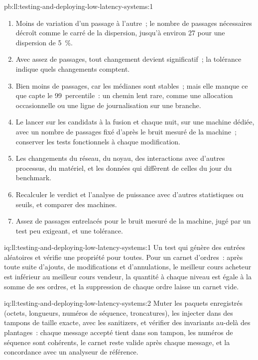 \begin{solution}{pb:ll:testing-and-deploying-low-latency-systems:1}
\begin{enumerate}
\item Moins de variation d'un passage à l'autre~; le nombre de passages nécessaires décroît comme le carré de la dispersion, jusqu'à environ 27 pour une dispersion de 5~\%.
\item Avec assez de passages, tout changement devient significatif~; la tolérance indique quels changements comptent.
\item Bien moins de passages, car les médianes sont stables~; mais elle manque ce que capte le 99~percentile~: un chemin lent rare, comme une
allocation occasionnelle ou une ligne de journalisation sur une branche.
\item Le lancer sur les candidats à la fusion et chaque nuit, sur une machine dédiée, avec un nombre de passages fixé d'après le
bruit mesuré de la machine~; conserver les tests fonctionnels à chaque modification.
\item Les changements du réseau, du noyau, des interactions avec d'autres processus, du matériel, et les données qui diffèrent de
celles du jour du benchmark.
\item Recalculer le verdict et l'analyse de puissance avec d'autres statistiques ou seuils, et comparer des machines.
\item Assez de passages entrelacés pour le bruit mesuré de la machine, jugé par un test peu exigeant, et une tolérance.
\end{enumerate}
\end{solution}

\begin{solution}{iq:ll:testing-and-deploying-low-latency-systems:1}
Un test qui génère des entrées aléatoires et vérifie une propriété pour toutes. Pour un carnet d'ordres~: après toute suite d'ajouts,
de modifications et d'annulations, le meilleur cours acheteur est inférieur au meilleur cours vendeur, la quantité à chaque niveau est égale à la somme de ses ordres, et
la suppression de chaque ordre laisse un carnet vide.
\end{solution}

\begin{solution}{iq:ll:testing-and-deploying-low-latency-systems:2}
Muter les paquets enregistrés (octets, longueurs, numéros de séquence, troncatures), les injecter dans des tampons de taille exacte, avec les sanitizers, et
vérifier des invariants au-delà des plantages~: chaque message accepté tient dans son tampon, les numéros de séquence sont cohérents, le carnet reste valide après
chaque message, et la concordance avec un analyseur de référence.
\end{solution}

